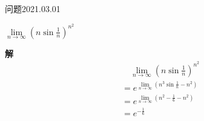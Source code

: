 \begin{mybox}{问题2021.03.01}
	
	\qquad $\lim\limits_{n \to \infty}(n\sin \frac{1}{n})^{n^2}$
\end{mybox}
\noindent
\textbf{解}
\begin{align*}
	&\quad\lim\limits_{n \to \infty}(n\sin \frac{1}{n})^{n^2}\\
	&=e^{\lim\limits_{n \to \infty}(n^3\sin \frac{1}{n}-n^2)}\\
	&=e^{\lim\limits_{n \to \infty} (n^2-\frac{1}{6}-n^2)}\\
	&=e^{-\frac{1}{6}}
\end{align*}